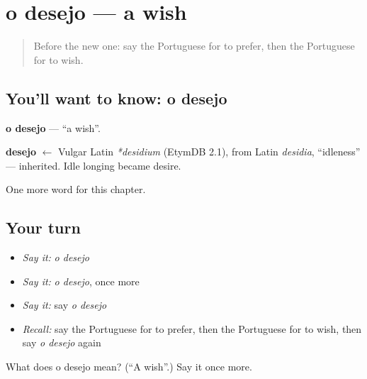 \section[o desejo]{o desejo — a wish}

\label{lesson:PT-C83-desejo}



\begin{quote}
Before the new one: say the Portuguese for to prefer, then the Portuguese for to wish.
\end{quote}

\subsection*{You'll want to know: o desejo}
\textbf{o desejo} — \textquotedblleft{}a wish\textquotedblright{}.

\begin{cousinweb}
\textbf{desejo} $\leftarrow$ Vulgar Latin \emph{*desidium} (EtymDB 2.1), from Latin \emph{desidia}, \textquotedblleft{}idleness\textquotedblright{} — inherited. Idle longing became desire.
\end{cousinweb}

\begin{grammarlens}[title={What you've built}]
One more word for this chapter.
\end{grammarlens}

\subsection*{Your turn}
\begin{itemize}
\raggedright
  \item \emph{Say it:} \emph{o desejo}
  \item \emph{Say it:} \emph{o desejo}, once more
  \item \emph{Say it:} say \emph{o desejo}
  \item \emph{Recall:} say the Portuguese for to prefer, then the Portuguese for to wish, then say \emph{o desejo} again
\end{itemize}

\begin{tcolorbox}[breakable,colback=teal!4,colframe=teal!35!black,title={Before you move on}]
What does o desejo mean? (\textquotedblleft{}A wish\textquotedblright{}.) Say it once more.
\end{tcolorbox}
